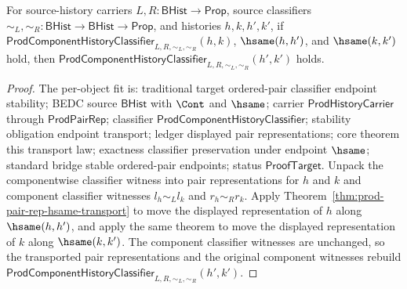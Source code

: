 \begin{theorem}
\label{thm:prod-component-history-classifier-hsame-transport}
For source-history carriers $L,R:\mathsf{BHist}\to\mathsf{Prop}$, source
classifiers $\sim_L,\sim_R:\mathsf{BHist}\to\mathsf{BHist}\to\mathsf{Prop}$,
and histories $h,k,h',k'$, if
$\mathsf{ProdComponentHistoryClassifier}_{L,R,\sim_L,\sim_R}(h,k)$,
$\hsame(h,h')$, and $\hsame(k,k')$ hold, then
$\mathsf{ProdComponentHistoryClassifier}_{L,R,\sim_L,\sim_R}(h',k')$ holds.
\end{theorem}
\begin{proof}
The per-object fit is: traditional target ordered-pair classifier endpoint
stability; BEDC source $\mathsf{BHist}$ with $\Cont$ and $\hsame$; carrier
$\mathsf{ProdHistoryCarrier}$ through $\mathsf{ProdPairRep}$; classifier
$\mathsf{ProdComponentHistoryClassifier}$; stability obligation endpoint
transport; ledger displayed pair representations; core theorem this transport
law; exactness classifier preservation under endpoint $\hsame$; standard bridge
stable ordered-pair endpoints; status $\mathsf{ProofTarget}$. Unpack the
componentwise classifier witness into pair representations for $h$ and $k$ and
component classifier witnesses $l_h\sim_L l_k$ and $r_h\sim_R r_k$. Apply
Theorem~\ref{thm:prod-pair-rep-hsame-transport} to move the displayed
representation of $h$ along $\hsame(h,h')$, and apply the same theorem to move
the displayed representation of $k$ along $\hsame(k,k')$. The component
classifier witnesses are unchanged, so the transported pair representations
and the original component witnesses rebuild
$\mathsf{ProdComponentHistoryClassifier}_{L,R,\sim_L,\sim_R}(h',k')$.
\end{proof}

